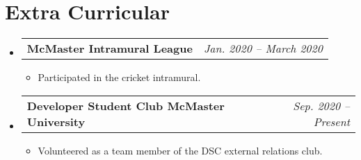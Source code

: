 \documentclass[letterpaper,11pt]{article}
\makeatletter
\newcommand{\resumeItem}[1]{
  \item\small{
    {#1 \vspace{-2pt}}
  }
}
\newcommand{\resumeProjectHeading}[2]{
    \item
    \begin{tabular*}{0.97\textwidth}{l@{\extracolsep{\fill}}r}
      \small#1 & #2 \\
    \end{tabular*}\vspace{-7pt}
}
\newcommand{\resumeSubHeadingListStart}{\begin{itemize}[leftmargin=0.15in, label={}]}
\newcommand{\resumeSubHeadingListEnd}{\end{itemize}}
\newcommand{\resumeItemListStart}{\begin{itemize}}
\newcommand{\resumeItemListEnd}{\end{itemize}\vspace{-5pt}}
\makeatother
\begin{document}
\section{Extra Curricular}
  \resumeSubHeadingListStart
    \resumeProjectHeading
          {\textbf{McMaster Intramural League}}{\small \textit{Jan. 2020 -- March 2020}}
      \resumeItemListStart
        \resumeItem{Participated in the cricket intramural.}
      \resumeItemListEnd
    \resumeProjectHeading
          {\textbf{Developer Student Club McMaster University}}{\small \textit{Sep. 2020 -- Present}}
      \resumeItemListStart
        \resumeItem{Volunteered as a team member of the DSC external relations club.}
      \resumeItemListEnd
  \resumeSubHeadingListEnd

\end{document}
